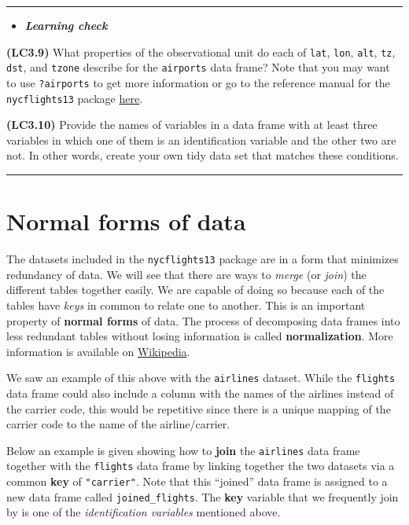 \documentclass[]{tufte-book}
\let\oldrule=\rule
\renewcommand{\rule}[1]{\oldrule{\linewidth}}
\newenvironment{rmdblock}[1]
  {\begin{shaded*}
  \begin{itemize}
  \renewcommand{\labelitemi}{
    \raisebox{-.7\height}[0pt][0pt]{
    }
  }
  \item
  }
  {
  \end{itemize}
  \end{shaded*}
  }
\newenvironment{learncheck}
  {\begin{rmdblock}{warning}}
  {\end{rmdblock}}
\begin{document}
\begin{center}\rule{0.5\linewidth}{\linethickness}\end{center}

\begin{learncheck}
\textbf{\emph{Learning check}}
\end{learncheck}

\textbf{(LC3.9)} What properties of the observational unit do each of
\texttt{lat}, \texttt{lon}, \texttt{alt}, \texttt{tz}, \texttt{dst}, and
\texttt{tzone} describe for the \texttt{airports} data frame? Note that
you may want to use \texttt{?airports} to get more information or go to
the reference manual for the \texttt{nycflights13} package
\href{https://cran.r-project.org/web/packages/nycflights13/nycflights13.pdf}{here}.

\textbf{(LC3.10)} Provide the names of variables in a data frame with at
least three variables in which one of them is an identification variable
and the other two are not. In other words, create your own tidy data set
that matches these conditions.

\begin{center}\rule{0.5\linewidth}{\linethickness}\end{center}

\section{Normal forms of data}\label{normal-forms-of-data}

The datasets included in the \texttt{nycflights13} package are in a form
that minimizes redundancy of data. We will see that there are ways to
\emph{merge} (or \emph{join}) the different tables together easily. We
are capable of doing so because each of the tables have \emph{keys} in
common to relate one to another. This is an important property of
\textbf{normal forms} of data. The process of decomposing data frames
into less redundant tables without losing information is called
\textbf{normalization}. More information is available on
\href{https://en.wikipedia.org/wiki/Database_normalization}{Wikipedia}.

We saw an example of this above with the \texttt{airlines} dataset.
While the \texttt{flights} data frame could also include a column with
the names of the airlines instead of the carrier code, this would be
repetitive since there is a unique mapping of the carrier code to the
name of the airline/carrier.

Below an example is given showing how to \textbf{join} the
\texttt{airlines} data frame together with the \texttt{flights} data
frame by linking together the two datasets via a common \textbf{key} of
\texttt{"carrier"}. Note that this ``joined'' data frame is assigned to
a new data frame called \texttt{joined\_flights}. The \textbf{key}
variable that we frequently join by is one of the \emph{identification
variables} mentioned above.
\end{document}
